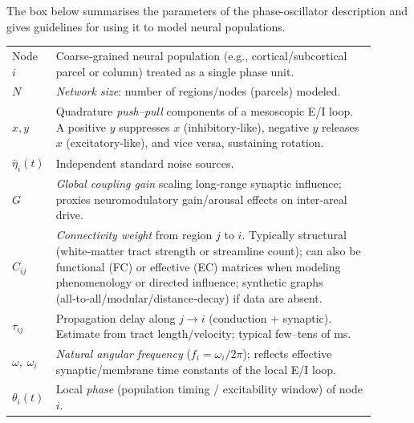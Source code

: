 \documentclass[12pt]{article}
\numberwithin{equation}{section}
\begin{document}
  

The box below summarises the parameters of the phase-oscillator description and gives guidelines for using it to model neural populations.

\begin{tcolorbox}[
  colback=gray!5,
  colframe=slate,
  colbacktitle=softblue!25,
  coltitle=softblue!60!black,
  fonttitle=\bfseries\small,
 title={\small  \textit{Coupled Undamped Harmonic Oscillators (Eq.~\ref{eq:kuramoto_connectome})}\\ Whole-brain Simulations Parameters \& Physiological Meaning },
  boxrule=0.4pt,
  enhanced, sharp corners,
  left=4pt,right=4pt,top=3pt,bottom=3pt,
  boxsep=2pt,
  before skip=6pt, after skip=6pt
]
\scriptsize
\begin{tabular}{@{}l p{0.9\linewidth}@{}}
Node $i$ & Coarse‑grained neural population (e.g., cortical/subcortical parcel or column) treated as a single phase unit.\\
\textbf{$N$} & \emph{Network size}: number of regions/nodes (parcels) modeled.\\
\textbf{$x,y$} & Quadrature \emph{push–pull} components of a mesoscopic E/I loop. A positive $y$ suppresses $x$ (inhibitory‑like), negative $y$ releases $x$ (excitatory‑like), and vice versa, sustaining rotation.\\
\textbf{$\hat\eta_i(t)$} & Independent standard noise sources.\\
\textbf{$G$} & \emph{Global coupling gain} scaling long‑range synaptic influence; proxies neuromodulatory gain/arousal effects on inter‑areal drive.\\
\textbf{$C_{ij}$} & \emph{Connectivity weight} from region $j$ to $i$. Typically structural (white‑matter tract strength or streamline count); can also be functional (FC) or effective (EC) matrices when modeling phenomenology or directed influence; synthetic graphs (all‑to‑all/modular/distance‑decay) if data are absent.\\
\textbf{$\tau_{ij}$} & Propagation delay along $j\!\to i$ (conduction + synaptic). Estimate from tract length/velocity; typical few–tens of ms.\\
\textbf{$\omega,\;\omega_i$} & \emph{Natural angular frequency} ($f_i=\omega_i/2\pi$); reflects effective synaptic/membrane time constants of the local E/I loop.\\
\textbf{$\theta_i(t)$} & Local \emph{phase} (population timing / excitability window) of node $i$.\\

\end{tabular}
\end{tcolorbox}
\end{document}
